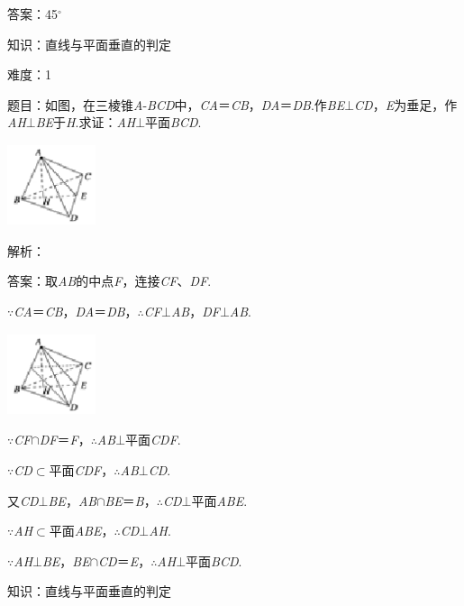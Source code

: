 \documentclass{article} %
\begin{document}
答案：45$\mathrm{{}^\circ}$

知识：直线与平面垂直的判定

难度：1

题目：如图，在三棱锥\textit{A}-\textit{BCD}中，\textit{CA}＝\textit{CB}，\textit{DA}＝\textit{DB}.作\textit{BE}$\mathrm{\bot}$\textit{CD}，\textit{E}为垂足，作\textit{AH}$\mathrm{\bot}$\textit{BE}于\textit{H}.求证：\textit{AH}$\mathrm{\bot}$平面\textit{BCD}.

\includegraphics*[width=1.02in, height=0.94in, keepaspectratio=false]{image197}

解析：

答案：取\textit{AB}的中点\textit{F}，连接\textit{CF}、\textit{DF}.

$\mathrm{\because}$\textit{CA}＝\textit{CB}，\textit{DA}＝\textit{DB}，$\mathrm{\therefore}$\textit{CF}$\mathrm{\bot}$\textit{AB}，\textit{DF}$\mathrm{\bot}$\textit{AB}.

\includegraphics*[width=1.02in, height=0.94in, keepaspectratio=false]{image198}

$\mathrm{\because}$\textit{CF}$\mathrm{\cap}$\textit{DF}＝\textit{F}，$\mathrm{\therefore}$\textit{AB}$\mathrm{\bot}$平面\textit{CDF}.

$\mathrm{\because}$\textit{CD}$\mathrm{\subset }$平面\textit{CDF}，$\mathrm{\therefore}$\textit{AB}$\mathrm{\bot}$\textit{CD}.

又\textit{CD}$\mathrm{\bot}$\textit{BE}，\textit{AB}$\mathrm{\cap}$\textit{BE}＝\textit{B}，$\mathrm{\therefore}$\textit{CD}$\mathrm{\bot}$平面\textit{ABE}.

$\mathrm{\because}$\textit{AH}$\mathrm{\subset }$平面\textit{ABE}，$\mathrm{\therefore}$\textit{CD}$\mathrm{\bot}$\textit{AH}.

$\mathrm{\because}$\textit{AH}$\mathrm{\bot}$\textit{BE}，\textit{BE}$\mathrm{\cap}$\textit{CD}＝\textit{E}，$\mathrm{\therefore}$\textit{AH}$\mathrm{\bot}$平面\textit{BCD}.

知识：直线与平面垂直的判定
\end{document}
